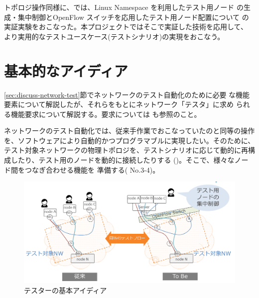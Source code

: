トポロジ操作同様に、\lopj では、Linux Namespace を利用したテスト用ノード
の生成・集中制御とOpenFlow スイッチを応用したテスト用ノード配置について
の実証実験をおこなった。本プロジェクトではそこで実証した技術を応用して、
より実用的なテストユースケース(テストシナリオ)の実現をおこなう。

 \section{基本的なアイディア}
 \label{sec:basic-tester-idea}



\ref{sec:discuss-network-test}節でネットワークのテスト自動化のために必要
な機能要素について解説したが、それらをもとにネットワーク「テスタ」に求め
られる機能要求について解説する。要求については \lopjtech も参照のこと。

ネットワークのテスト自動化では、従来手作業でおこなっていたのと同等の操作
を、ソフトウェアにより自動的かつプログラマブルに実現したい。そのために、
テスト対象ネットワークの物理トポロジを、テストシナリオに応じて動的に再構
成したり、テスト用のノードを動的に接続したりする
()。そこで、様々なノード間をつなぎ合わせる機能を
準備する( No.3-4)。

\begin{figure}[h]
 \centering
 \includegraphics[scale=0.5]{img/basic-idea.png}
 \caption{テスターの基本アイディア}
 \label{fig:basic-idea}
\end{figure}

